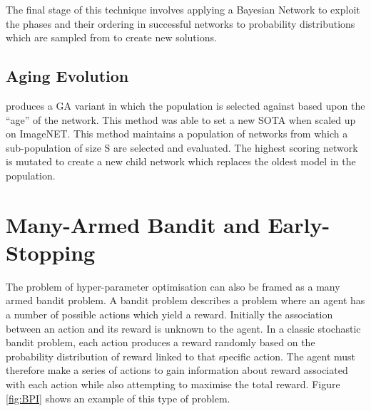 \documentclass{article}
\begin{document}
		The final stage of this technique involves applying a Bayesian Network to exploit the phases and their ordering in successful networks to probability distributions which are sampled from to create new solutions.


	\subsection{Aging Evolution}

		\cite{42} produces a GA variant in which the population is selected against based upon the “age” of the network. This method was able to set a new SOTA when scaled up on ImageNET.
		This method maintains a population of networks from which a sub-population of size S are selected and evaluated. The highest scoring network is mutated to create a new child network which replaces the oldest model in the population.  




\section {Many-Armed Bandit and Early-Stopping}



	The problem of hyper-parameter optimisation can also be framed as a many armed bandit problem. 
	A bandit problem describes a problem where an agent has a number of possible actions which yield a reward. Initially the association between an action and its reward is unknown to the agent. In a classic stochastic bandit problem, each action produces a reward randomly based on the probability distribution of reward linked to that specific action. The agent must therefore make a series of actions to gain information about reward associated with each action while also attempting to maximise the total reward. Figure \ref{fig:BPI}  shows an example of this type of problem. 
\end{document}
